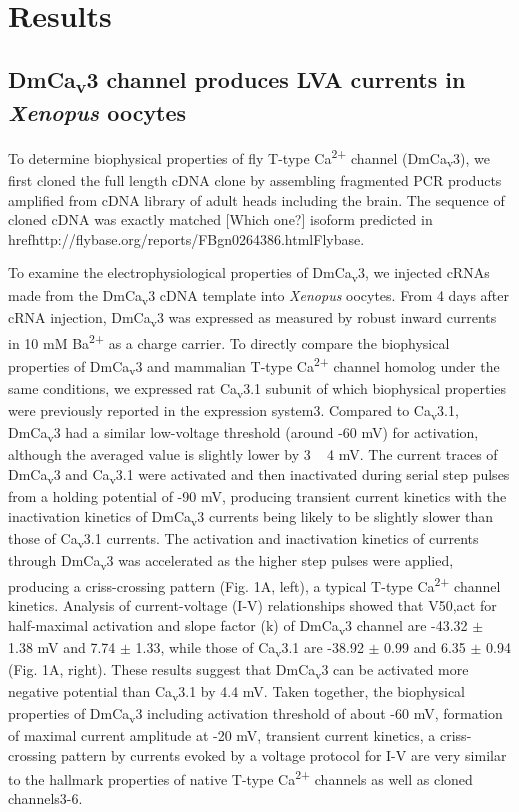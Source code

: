 \section*{Results}

\subsection*{DmCa\textsubscript{v}3 channel produces LVA currents in \emph{Xenopus} oocytes}

To determine biophysical properties of fly T-type Ca\textsuperscript{2+} channel (DmCa\textsubscript{v}3), we first cloned the full length cDNA clone by assembling fragmented PCR products amplified from cDNA library of adult heads including the brain.
The sequence of cloned cDNA was exactly matched [Which one?] isoform predicted in href{http://flybase.org/reports/FBgn0264386.html}{Flybase}.

To examine the electrophysiological properties of DmCa\textsubscript{v}3, we injected cRNAs made from the DmCa\textsubscript{v}3 cDNA template into \emph{Xenopus} oocytes.
From 4 days after cRNA injection, DmCa\textsubscript{v}3 was expressed as measured by robust inward currents in 10 mM Ba\textsuperscript{2+} as a charge carrier.
To directly compare the biophysical properties of DmCa\textsubscript{v}3 and mammalian T-type Ca\textsuperscript{2+} channel homolog under the same conditions, we expressed rat Ca\textsubscript{v}3.1 subunit of which biophysical properties were previously reported in the expression system3.
Compared to Ca\textsubscript{v}3.1, DmCa\textsubscript{v}3 had a similar low-voltage threshold (around -60 mV) for activation, although the averaged value is slightly lower by 3 ~ 4 mV.
The current traces of DmCa\textsubscript{v}3 and Ca\textsubscript{v}3.1 were activated and then inactivated during serial step pulses from a holding potential of -90 mV, producing transient current kinetics with the inactivation kinetics of DmCa\textsubscript{v}3 currents being likely to be slightly slower than those of Ca\textsubscript{v}3.1 currents.
The activation and inactivation kinetics of currents through DmCa\textsubscript{v}3 was accelerated as the higher step pulses were applied, producing a criss-crossing pattern (Fig. 1A, left), a typical T-type Ca\textsuperscript{2+} channel kinetics.
Analysis of current-voltage (I-V) relationships showed that V50,act for half-maximal activation and slope factor (k) of DmCa\textsubscript{v}3 channel are -43.32 $\pm$ 1.38 mV and 7.74 $\pm$ 1.33, while those of Ca\textsubscript{v}3.1 are -38.92 $\pm$ 0.99 and 6.35 $\pm$ 0.94 (Fig. 1A, right).
These results suggest that DmCa\textsubscript{v}3 can be activated more negative potential than Ca\textsubscript{v}3.1 by 4.4 mV.
Taken together, the biophysical properties of DmCa\textsubscript{v}3 including activation threshold of about -60 mV, formation of maximal current amplitude at -20 mV, transient current kinetics, a criss-crossing pattern by currents evoked by a voltage protocol for I-V are very similar to the hallmark properties of native T-type Ca\textsuperscript{2+} channels as well as cloned channels3-6.

